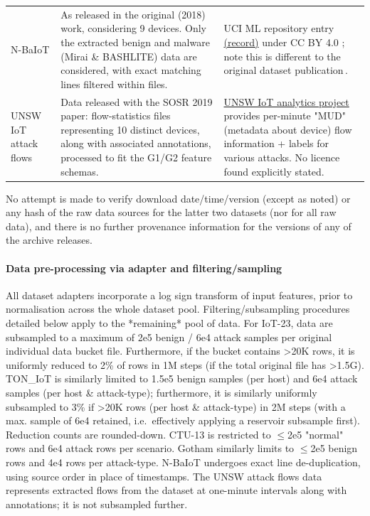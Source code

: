 {\begin{longtable}{>{\raggedright\arraybackslash}p{}>{\raggedright\arraybackslash}p{}>{\raggedright\arraybackslash}p{}}
N-BaIoT & As released in the original (2018) work, considering 9 devices. Only the extracted benign and malware (Mirai \& BASHLITE) data are considered, with exact matching lines filtered within files. & UCI ML repository entry \href{https://doi.org/10.24432/C5RC8J}{(record)} under CC BY 4.0 \cite{nbaiotdata2018}; note this is different to the original dataset publication\,\cite{nbaiot2018}.\\
UNSW IoT attack flows & Data released with the SOSR 2019 paper: flow-statistics files representing 10 distinct devices, along with associated annotations, processed to fit the G1/G2 feature schemas. & \href{https://iotanalytics.unsw.edu.au/attack-data.html}{UNSW IoT analytics project} provides per-minute "MUD" (metadata about device) flow information + labels for various attacks. No licence found explicitly stated.\\
\end{longtable}} 

No attempt is made to verify download date/time/version (except as noted) or any hash of the raw data sources for the latter two datasets (nor for all raw data), and there is no further provenance information for the versions of any of the archive releases.

\paragraph{Data pre-processing via adapter and filtering/sampling} 
All dataset adapters incorporate a log sign transform of input features, prior to normalisation across the whole dataset pool. Filtering/subsampling procedures detailed below apply to the *remaining* pool of data. For IoT-23, data are subsampled to a maximum of 2e5 benign / 6e4 attack samples per original individual data bucket file. Furthermore, if the bucket contains >20K rows, it is uniformly reduced to 2\% of rows in 1M steps (if the total original file has >1.5G). TON\_IoT is similarly limited to 1.5e5 benign samples (per host) and 6e4 attack samples (per host \& attack-type); furthermore, it is similarly uniformly subsampled to 3\% if >20K rows (per host \& attack-type) in 2M steps (with a max. sample of 6e4 retained, i.e.\ effectively applying a reservoir subsample first). Reduction counts are rounded-down. CTU-13 is restricted to $\leq$2e5 "normal" rows and 6e4 attack rows per scenario. Gotham similarly limits to $\leq$2e5 benign rows and 4e4 rows per attack-type. N-BaIoT undergoes exact line de-duplication, using source order in place of timestamps. The UNSW attack flows data represents extracted flows from the dataset at one-minute intervals along with annotations; it is not subsampled further.
